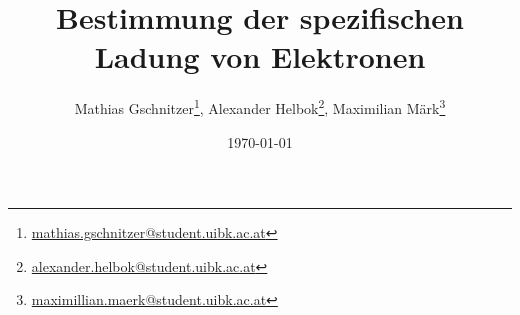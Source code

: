\thispagestyle{empty}
\titlehead{\texttt{[image: logo.jpg]}}
\title{Bestimmung der spezifischen Ladung von Elektronen}
\author{Mathias Gschnitzer\thanks{\href{mailto:mathias.gschnitzer@uibk.ac.at}{mathias.gschnitzer@student.uibk.ac.at}},
		Alexander Helbok\thanks{\href{alexander.helbok@student.uibk.ac.at}{alexander.helbok@student.uibk.ac.at}}, 
		Maximilian Märk\thanks{\href{maximillian.maerk@student.uibk.ac.at}{maximillian.maerk@student.uibk.ac.at}}}
\date{\today}
\maketitle
\vfill 